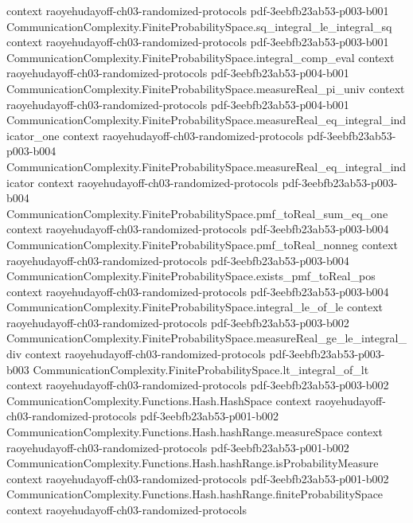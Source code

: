 \begin{theorem}
  {context}
  {raoyehudayoff-ch03-randomized-protocols}
  {pdf-3eebfb23ab53-p003-b001}
\proofstep
  {CommunicationComplexity.FiniteProbabilitySpace.sq_integral_le_integral_sq}
  {context}
  {raoyehudayoff-ch03-randomized-protocols}
  {pdf-3eebfb23ab53-p003-b001}
\proofstep
  {CommunicationComplexity.FiniteProbabilitySpace.integral_comp_eval}
  {context}
  {raoyehudayoff-ch03-randomized-protocols}
  {pdf-3eebfb23ab53-p004-b001}
\proofstep
  {CommunicationComplexity.FiniteProbabilitySpace.measureReal_pi_univ}
  {context}
  {raoyehudayoff-ch03-randomized-protocols}
  {pdf-3eebfb23ab53-p004-b001}
\proofstep
  {CommunicationComplexity.FiniteProbabilitySpace.measureReal_eq_integral_indicator_one}
  {context}
  {raoyehudayoff-ch03-randomized-protocols}
  {pdf-3eebfb23ab53-p003-b004}
\proofstep
  {CommunicationComplexity.FiniteProbabilitySpace.measureReal_eq_integral_indicator}
  {context}
  {raoyehudayoff-ch03-randomized-protocols}
  {pdf-3eebfb23ab53-p003-b004}
\proofstep
  {CommunicationComplexity.FiniteProbabilitySpace.pmf_toReal_sum_eq_one}
  {context}
  {raoyehudayoff-ch03-randomized-protocols}
  {pdf-3eebfb23ab53-p003-b004}
\proofstep
  {CommunicationComplexity.FiniteProbabilitySpace.pmf_toReal_nonneg}
  {context}
  {raoyehudayoff-ch03-randomized-protocols}
  {pdf-3eebfb23ab53-p003-b004}
\proofstep
  {CommunicationComplexity.FiniteProbabilitySpace.exists_pmf_toReal_pos}
  {context}
  {raoyehudayoff-ch03-randomized-protocols}
  {pdf-3eebfb23ab53-p003-b004}
\proofstep
  {CommunicationComplexity.FiniteProbabilitySpace.integral_le_of_le}
  {context}
  {raoyehudayoff-ch03-randomized-protocols}
  {pdf-3eebfb23ab53-p003-b002}
\proofstep
  {CommunicationComplexity.FiniteProbabilitySpace.measureReal_ge_le_integral_div}
  {context}
  {raoyehudayoff-ch03-randomized-protocols}
  {pdf-3eebfb23ab53-p003-b003}
\proofstep
  {CommunicationComplexity.FiniteProbabilitySpace.lt_integral_of_lt}
  {context}
  {raoyehudayoff-ch03-randomized-protocols}
  {pdf-3eebfb23ab53-p003-b002}
\proofstep
  {CommunicationComplexity.Functions.Hash.HashSpace}
  {context}
  {raoyehudayoff-ch03-randomized-protocols}
  {pdf-3eebfb23ab53-p001-b002}
\proofstep
  {CommunicationComplexity.Functions.Hash.hashRange.measureSpace}
  {context}
  {raoyehudayoff-ch03-randomized-protocols}
  {pdf-3eebfb23ab53-p001-b002}
\proofstep
  {CommunicationComplexity.Functions.Hash.hashRange.isProbabilityMeasure}
  {context}
  {raoyehudayoff-ch03-randomized-protocols}
  {pdf-3eebfb23ab53-p001-b002}
\proofstep
  {CommunicationComplexity.Functions.Hash.hashRange.finiteProbabilitySpace}
  {context}
  {raoyehudayoff-ch03-randomized-protocols}

\end{theorem}
